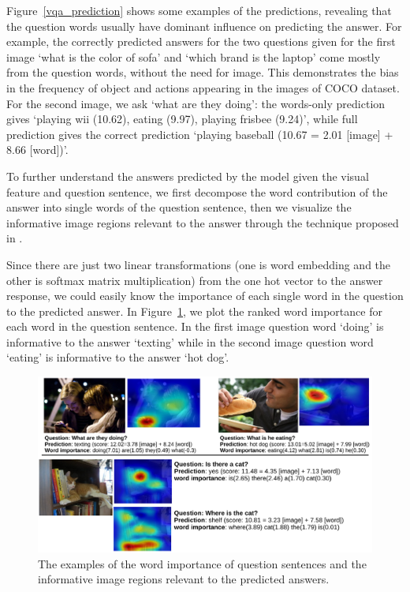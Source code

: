 \documentclass{article} %
\begin{document}
Figure~\ref{vqa_prediction} shows some examples of the predictions, revealing that the question words usually have dominant influence on predicting the answer. For example, the correctly predicted answers for the two questions given for the first image `what is the color of sofa' and `which brand is the laptop' come mostly from the question words, without the need for image. This demonstrates the bias in the frequency of object and actions appearing in the images of COCO dataset. For the second image, we ask `what are they doing': the words-only prediction gives `playing wii (10.62), eating (9.97), playing frisbee (9.24)', while full prediction gives the correct prediction `playing baseball (10.67 = 2.01 [image] + 8.66 [word])'.  

To further understand the answers predicted by the model given the visual feature and question sentence, we first decompose the word contribution of the answer into single words of the question sentence, then we visualize the informative image regions relevant to the answer through the technique proposed in \cite{zhou2015localizable}. 

Since there are just two linear transformations (one is word embedding and the other is softmax matrix multiplication) from the one hot vector to the answer response, we could easily know the importance of each single word in the question to the predicted answer. In Figure~\ref{CAM}, we plot the ranked word importance for each word in the question sentence. In the first image question word `doing' is informative to the answer `texting' while in the second image question word `eating' is informative to the answer `hot dog'. 

\begin{figure}
\begin{center}
\includegraphics[width=0.9\linewidth]{CAM.pdf}
\end{center}
\caption{The examples of the word importance of question sentences and the informative image regions relevant to the predicted answers.}\label{CAM}
\end{figure}
\end{document}
